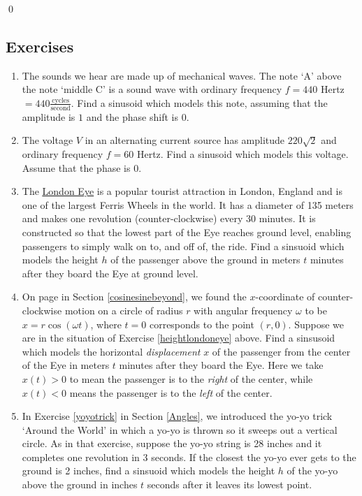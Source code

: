 \vspace{-.35in} \qed

\newpage

\subsection{Exercises}

\begin{enumerate}

\item  The sounds we hear are made up of mechanical waves.  The note `A' above the note `middle C' is a sound wave with ordinary frequency $f = 440$ Hertz $= 440 \frac{\text{cycles}}{\text{second}}$.  Find a sinusoid which models this note, assuming that the amplitude is $1$ and the phase shift is $0$.

\item The voltage $V$ in an alternating current source has amplitude $220 \sqrt{2}$ and ordinary frequency $f = 60$ Hertz.  Find a sinusoid which models this voltage.  Assume that the phase is $0$.


\item \label{heightlondoneye} The \href{http://en.wikipedia.org/wiki/London_Eye}{\underline{London Eye}} is a popular tourist attraction in London, England and is one of the largest Ferris Wheels in the world.  It has a diameter of 135 meters and makes one revolution (counter-clockwise) every 30 minutes.  It is constructed so that the lowest part of the Eye reaches ground level, enabling passengers to simply walk on to, and off of, the ride.  Find a sinsuoid which models the height $h$ of the passenger above the ground in meters $t$ minutes after they board the Eye at ground level.

\item \label{leftrightlondoneye} On page \pageref{equationsforcircularmotion} in Section \ref{cosinesinebeyond}, we found the $x$-coordinate of counter-clockwise motion on a circle of radius $r$ with angular frequency $\omega$ to be $x = r\cos(\omega t)$, where $t=0$ corresponds to the point $(r,0)$.  Suppose we are in the situation of Exercise \ref{heightlondoneye} above.  Find a sinsusoid which models the horizontal \textit{displacement} $x$ of the passenger from the center of the Eye in meters $t$ minutes after they board the Eye.  Here we take $x(t) > 0$ to mean the passenger is to the \textit{right} of the center, while $x(t) < 0$ means the passenger is to the \textit{left} of the center.

\item  In Exercise \ref{yoyotrick} in Section \ref{Angles}, we introduced the yo-yo trick `Around the World' in which a yo-yo is thrown so it sweeps out a vertical circle.  As in that exercise, suppose the yo-yo string is 28 inches and it completes one revolution in 3 seconds.  If the closest the yo-yo ever gets to the ground is 2 inches, find a sinsuoid which models the height $h$ of the yo-yo above the ground in inches $t$ seconds after it leaves its lowest point.



\end{enumerate}
